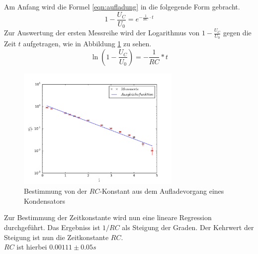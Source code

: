 Am Anfang wird die Formel \eqref{eqn:aufladung} in die folgegende
Form gebracht.
\begin{equation}
1-\frac{U_C}{U_0}=e^{-{\frac{1}{RC}\cdot t}}
\end{equation}
Zur Auswertung der ersten Messreihe wird der Logarithmus
von $1-\frac{U_C}{U_0}$ gegen die Zeit $t$ aufgetragen, wie in Abbildung \ref{abb:a} zu sehen.
\begin{equation}
  \ln \left(1-\frac{U_C}{U_0}\right)=-\frac{1}{RC}*t
\end{equation}
\begin{figure}[!h]
  \centering
  \includegraphics[width=0.7\textwidth]{a.pdf}
  \caption{Bestimmung von der $RC$-Konstant aus dem
  Aufladevorgang eines Kondensators}
\label{abb:a}
\end{figure}
\FloatBarrier
Zur Bestimmung der Zeitkonstante wird nun eine lineare Regression durchgeführt.
Das Ergebniss ist $1/RC$ als Steigung der Graden.
Der Kehrwert der Steigung ist nun die Zeitkonstante $RC$.\\
$RC$ ist hierbei $0.00111\pm0.05 s$
\\
